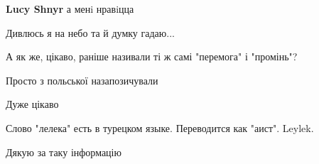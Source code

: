 \begin{itemize}
\begin{itemize}
\textbf{Lucy Shnyr} а менi нравiцца🤣🤣🤣

 
Дивлюсь я на небо та й думку гадаю...
\end{itemize}

 
А як же, цікаво, раніше називали ті ж самі "перемога" і "промінь"?

 
Просто з польської назапозичували

 
Дуже цікаво

 
Слово "лелека" есть в турецком языке. Переводится как "аист". Leylek.

 
Дякую за таку інформацію

 


\end{itemize}
